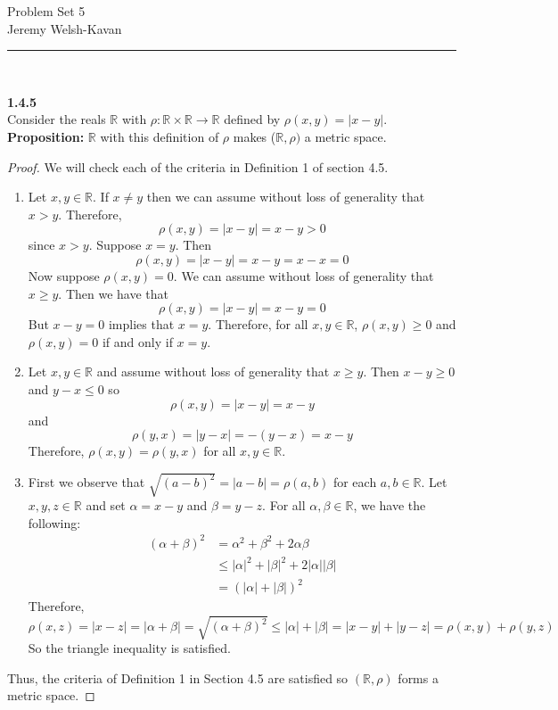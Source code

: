 \documentclass[]{book}
\begin{document}
\begin{center}
{\Large Problem Set 5}\\
{Jeremy Welsh-Kavan}\\
\end{center}
\vspace{0.2 cm}
\begin{center}
\noindent\rule{15cm}{0.4pt} \\
\end{center}
{\bf 1.4.5} \\

Consider the reals $\mathbb{R}$ with $\rho:\mathbb{R}\times \mathbb{R}\to \mathbb{R}$ defined by $\rho(x,y)=|x-y|$. \\

{\bf Proposition:} $\mathbb{R}$ with this definition of $\rho$ makes ($\mathbb{R},\rho)$ a metric space. \\
\begin{proof}
We will check each of the criteria in Definition 1 of section 4.5.
\begin{enumerate}[1.]
\item Let $x,y\in \mathbb{R}$. If $x\neq y$ then we can assume without loss of generality that $x>y$. Therefore, $$\rho(x,y)=|x-y|=x-y>0$$ since $x>y$. Suppose $x=y$. Then $$\rho(x,y)=|x-y|=x-y=x-x=0$$
Now suppose $\rho(x,y)=0$. We can assume without loss of generality that $x\geqslant y$. Then we have that $$\rho(x,y)=|x-y|=x-y=0$$
But $x-y=0$ implies that $x=y$. Therefore, for all $x,y\in \mathbb{R}$, $\rho(x,y)\geqslant 0$ and $\rho(x,y)=0$ if and only if $x=y$. \\
\item Let $x,y\in \mathbb{R}$ and assume without loss of generality that $x\geqslant y$. Then $x-y\geqslant 0$ and $y-x\leqslant 0$ so $$\rho(x,y)=|x-y|=x-y$$ and $$\rho(y,x)=|y-x|=-(y-x)=x-y$$
Therefore, $\rho(x,y)=\rho(y,x)$ for all $x,y\in \mathbb{R}$. \\
\item First we observe that $\sqrt{(a-b)^2}=|a-b|=\rho(a,b)$ for each $a,b\in \mathbb{R}$. Let $x,y,z\in \mathbb{R}$ and set $\alpha=x-y$ and $\beta=y-z$. For all $\alpha,\beta\in \mathbb{R}$, we have the following:
\begin{align*} 
(\alpha+\beta)^2 &= \alpha^2 + \beta^2 + 2\alpha \beta \\
&\leqslant |\alpha|^2 + |\beta|^2 + 2|\alpha||\beta| \\
&=(|\alpha| + |\beta|)^2
\end{align*}
Therefore, $$\rho(x,z)=|x-z|=|\alpha+\beta|=\sqrt{(\alpha+\beta)^2}\leqslant |\alpha| + |\beta|=|x-y|+|y-z|=\rho(x,y)+\rho(y,z)$$
So the triangle inequality is satisfied.
\end{enumerate}
Thus, the criteria of Definition 1 in Section 4.5 are satisfied so $(\mathbb{R},\rho)$ forms a metric space.
\end{proof}
\end{document}
